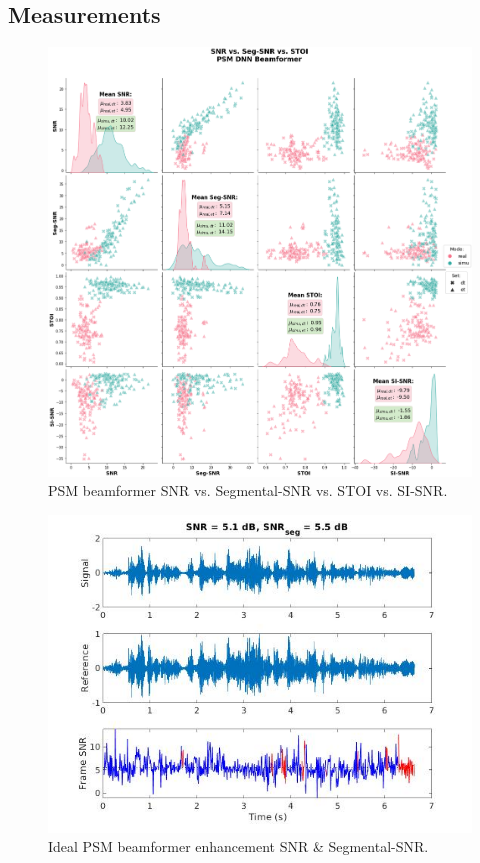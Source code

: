 \subsection{Measurements}
\begin{figure}[H]
    \centering
    \includegraphics[width=\linewidth]{Features/images/psm_snr_stoi}
    \caption{PSM beamformer SNR vs. Segmental-SNR vs. STOI vs. SI-SNR.}\label{fig:psm_snr_stoi}
\end{figure}

\begin{figure}[H]
    \centering
    \includegraphics[width=\linewidth]{Features/images/psm_ideal_snr}
    \caption{Ideal PSM beamformer enhancement SNR \& Segmental-SNR.}\label{fig:psm_ideal_snr}
\end{figure}



